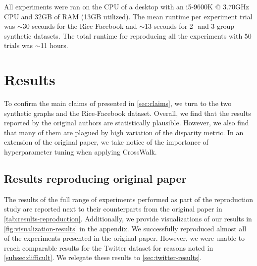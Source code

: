 All experiments were ran on the CPU of a desktop with an i5-9600K @ 3.70GHz CPU and 32GB of RAM (13GB utilized). The mean runtime per experiment trial was $\sim$30 seconds for the Rice-Facebook and $\sim$13 seconds for 2- and 3-group synthetic datasets. The total runtime for reproducing all the experiments with 50 trials was $\sim$11 hours.


\section{Results}
\label{sec:results}


To confirm the main claims of \citet{Khajehnejad2022} presented in \autoref{sec:claims}, we turn to the two synthetic graphs and the Rice-Facebook dataset. Overall, we find that the results reported by the original authors are statistically plausible. However, we also find that many of them are plagued by high variation of the disparity metric. In an extension of the original paper, we take notice of the importance of hyperparameter tuning when applying CrossWalk.

\subsection{Results reproducing original paper}


The results of the full range of experiments performed as part of the reproduction study are reported next to their counterparts from the original paper in \autoref{tab:results-reproduction}. Additionally, we provide visualizations of our results in \autoref{fig:visualization-results} in the appendix. We successfully reproduced almost all of the experiments presented in the original paper. However, we were unable to reach comparable results for the Twitter dataset for reasons noted in \autoref{subsec:difficult}. We relegate these results to \autoref{sec:twitter-results}.

